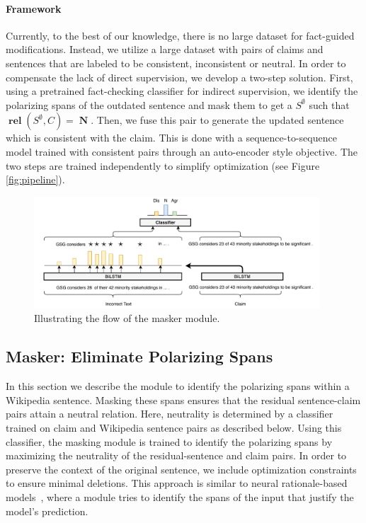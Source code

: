 \documentclass[letterpaper]{article} %
\newcommand{\figref}[1]{Figure \ref{#1}}
\DeclareMathOperator{\rel}{\boldsymbol{rel}}
\DeclareMathOperator{\N}{\boldsymbol{N}}
\begin{document}
\paragraph{Framework}



Currently, to the best of our knowledge, there is no large dataset for fact-guided modifications. Instead, we utilize a large dataset with pairs of claims and sentences that are labeled to be consistent, inconsistent or neutral.
In order to compensate the lack of direct supervision, we develop a two-step solution. First, using a pretrained fact-checking classifier for indirect supervision, we identify the polarizing spans of the outdated sentence and mask them to get a $S^{\emptyset}$ such that $\rel(S^{\emptyset},C) = \N$. Then, we fuse this pair to generate the updated sentence which is consistent with the claim. This is done with a sequence-to-sequence model trained with consistent pairs through an auto-encoder style objective. The two steps are trained independently to simplify optimization (see \figref{fig:pipeline}).


\begin{figure}[!t]
\centering
\includegraphics[width=0.95\textwidth]{mask_gen.pdf}
\caption{Illustrating the flow of the masker module.
}\label{fig:mask_gen}
\end{figure}
\subsection{Masker: Eliminate Polarizing Spans} \label{sec:mask_gen}

In this section we describe the module to identify the polarizing spans within a Wikipedia sentence. Masking these spans ensures that the residual sentence-claim pairs attain a neutral relation. Here, neutrality is determined by a classifier trained on claim and Wikipedia sentence pairs as described below. Using this classifier, the masking module is trained to identify the polarizing spans by maximizing the neutrality of the residual-sentence and claim pairs. In order to preserve the context of the original sentence, we include optimization constraints to ensure minimal deletions. This approach is similar to neural rationale-based models~\cite{lei-rational}, where a module tries to identify the spans of the input that justify the model's prediction.
\end{document}
